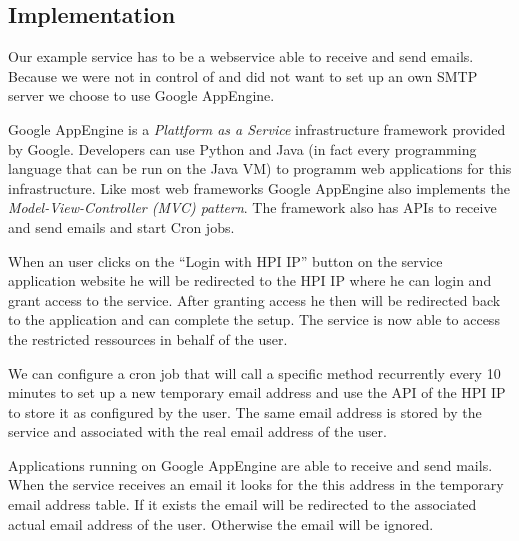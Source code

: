 \subsection{Implementation}

Our example service has to be a webservice able to receive and send
emails. Because we were not in control of and did not want to set
up an own SMTP server we choose to use Google AppEngine. \cite{gae}

Google AppEngine is a \emph{Plattform as a Service} infrastructure
framework provided by Google. Developers can use Python and Java
(in fact every programming language that can be run on the Java VM)
to programm web applications for this infrastructure. Like most web
frameworks Google AppEngine also implements the
\emph{Model-View-Controller (MVC) pattern}. The framework also has
APIs to receive and send emails and start Cron jobs. \cite{gae-mail} \cite{gae-cron}   

When an user clicks on the ``Login with HPI IP'' button on the service
application website he will be redirected to the HPI IP where he
can login and grant access to the service. After granting access he
then will be redirected back to the application and can complete
the setup. The service is now able to access the restricted
ressources in behalf of the user.

We can configure a cron job that will call a specific method
recurrently every 10 minutes to set up a new temporary email
address and use the API of the HPI IP to store it as configured by
the user. The same email address is stored by the service and
associated with the real email address of the user.

Applications running on Google AppEngine are able to receive and
send mails. When the service receives an email it looks for the
this address in the temporary email address table. If it exists the
email will be redirected to the associated actual email address of
the user. Otherwise the email will be ignored.
